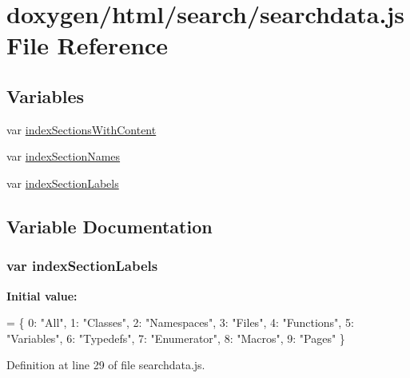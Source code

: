 \hypertarget{a00102}{}\section{doxygen/html/search/searchdata.js File Reference}
\label{a00102}
\subsection*{Variables}
\begin{DoxyCompactItemize}
\item 
var \hyperlink{a00102_a6250af3c9b54dee6efc5f55f40c78126}{index\+Sections\+With\+Content}
\item 
var \hyperlink{a00102_a77149ceed055c6c6ce40973b5bdc19ad}{index\+Section\+Names}
\item 
var \hyperlink{a00102_a529972e449c82dc118cbbd3bcf50c44d}{index\+Section\+Labels}
\end{DoxyCompactItemize}


\subsection{Variable Documentation}
\hypertarget{a00102_a529972e449c82dc118cbbd3bcf50c44d}{}
\subsubsection[{index\+Section\+Labels}]{\setlength{\rightskip}{0pt plus 5cm}var index\+Section\+Labels}\label{a00102_a529972e449c82dc118cbbd3bcf50c44d}
{\bfseries Initial value\+:}
\begin{DoxyCode}
=
\{
  0: \textcolor{stringliteral}{"All"},
  1: \textcolor{stringliteral}{"Classes"},
  2: \textcolor{stringliteral}{"Namespaces"},
  3: \textcolor{stringliteral}{"Files"},
  4: \textcolor{stringliteral}{"Functions"},
  5: \textcolor{stringliteral}{"Variables"},
  6: \textcolor{stringliteral}{"Typedefs"},
  7: \textcolor{stringliteral}{"Enumerator"},
  8: \textcolor{stringliteral}{"Macros"},
  9: \textcolor{stringliteral}{"Pages"}
\}
\end{DoxyCode}


Definition at line 29 of file searchdata.\+js.

\hypertarget{a00102_a77149ceed055c6c6ce40973b5bdc19ad}{}
